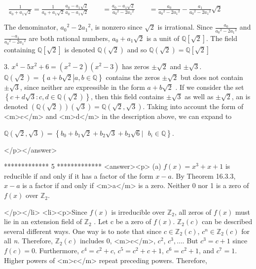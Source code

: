  \(\text{            }\frac{1}{a_0+ a_1\sqrt{2}}=\frac{1}{a_0+ a_1\sqrt{2}}\frac{a_0- a_1\sqrt{2}}{a_0- a_1\sqrt{2}}\quad \quad =\frac{a_0-
a_1\sqrt{2}}{a_0{}^2- 2a_1{}^2}\quad \quad =\frac{a_0}{a_0{}^2- 2a_1{}^2}-\frac{ a_1}{a_0{}^2- 2a_1{}^2}\sqrt{2}\)



The denominator, \(a_0{}^2- 2a_1{}^2\), is nonzero since \(\sqrt{2}\) is irrational.  Since \(\frac{a_0}{a_0{}^2- 2a_1{}^2}\) and\(\frac{-a_1}{a_0{}^2-
2a_1{}^2}\) are both rational numbers, \(a_0+ a_1\sqrt{2}\) is a unit of \(\mathbb{Q}\left[\sqrt{2}\right]\).  The field containing \(\mathbb{Q}\left[\sqrt{2}\right]\)
is denoted \(\mathbb{Q}\left(\sqrt{2}\right)\) and so \(\mathbb{Q}\left(\sqrt{2}\right)=\mathbb{Q}\left[\sqrt{2}\right]\) 



 3. \(x^4 - 5x^2 +6 = \left(x^2 - 2\right)\left(x^2 - 3\right)\) has zeros \(\pm \sqrt{2}\) and \(\pm \sqrt{3}\). \(\mathbb{Q}\left(\sqrt{2}\right)
= \left\{\left.a + b\sqrt{2} \right| a, b \in  \mathbb{Q}\right\}\) contains the zeros \(\pm \sqrt{2}\) but does not contain \(\pm \sqrt{3}\), since
neither are expressible in the form \(a + b\sqrt{2}\) . If we consider the set \(\left\{c + d\sqrt{3} : c,d \in  \mathbb{Q}\left(\sqrt{2}\right)\right\}\),
then this field contains \(\pm \sqrt{3}\) as well as \(\pm \sqrt{2}\), an is denoted  \(\left(\mathbb{Q}\left(\sqrt{2}\right)\right)\left(\sqrt{3}
\right)= \mathbb{Q}\left(\sqrt{2}, \sqrt{3}\right)\).  Taking into account the form of <m>c</m> and <m>d</m> in the description above, we
can expand to



\(\mathbb{Q}\left(\sqrt{2},\sqrt{3}\right)= \left\{b_0 + b_1\sqrt{2} + b_2 \sqrt{3} +b_3\sqrt{6} |\text{  }b_i \in  \mathbb{Q}\right\}\).

</p></answer>


*************
5
*************
<answer><p> (a) \(f(x) = x^3 + x + 1\) is reducible if and only if it has a factor of the form \(x- a\). By Theorem 16.3.3, \(x-a\) is a factor if and only
if <m>a</m> is a zero. Neither 0 nor 1 is a zero of \(f(x)\) over \(\mathbb{Z}_2\).

</p></li>
<li><p>Since \(f(x)\) is irreducible over \(\mathbb{Z}_2\), all zeros of \(f(x)\) must lie in an extension field of \(\mathbb{Z}_2\) . Let c be a zero
of \(f(x)\).   \(\mathbb{Z}_2(c)\) can be described several different ways.  One way is to note that since \(c \in  \mathbb{Z}_2(c)\), \(c^n\in
\mathbb{Z}_2(c)\) for all \textit{ n. }Therefore, \(\mathbb{Z}_2(c)\) includes 0, <m>c</m>, \(c^2\), \(c^3, \ldots\). But \(c^3 = c + 1\) since
\(f(c) = 0\). Furthermore, \(c^4 = c^2+ c\), \(c^5= c^2+ c +1\), \(c^6= c^2+1\), and \(c^7=1\).  Higher powers of <m>c</m> repeat preceding
powers.  Therefore, 



